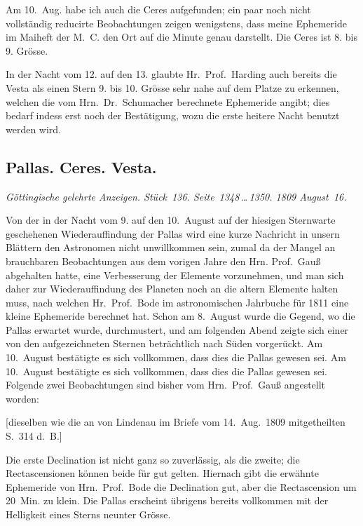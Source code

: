\documentclass[12pt,a4paper]{book}
\begin{document}
Am 10.~Aug. habe ich auch die Ceres aufgefunden; ein paar noch nicht vollst\"andig reducirte Beobachtungen zeigen wenigstens, dass meine Ephemeride im Maiheft der M.~C. den Ort auf die Minute genau darstellt. Die Ceres ist 8. bis 9. Gr\"osse.

In der Nacht vom 12. auf den 13. glaubte Hr.~Prof.~Harding auch bereits die Vesta als einen Stern 9. bis 10. Gr\"osse sehr nahe auf dem Platze zu erkennen, welchen die vom Hrn.~Dr.~Schumacher berechnete Ephemeride angibt; dies bedarf indess erst noch der Best\"atigung, wozu die erste heitere Nacht benutzt werden wird.


\newpage
\subsection*{Pallas. Ceres. Vesta.}

\textit{G\"ottingische gelehrte Anzeigen. St\"uck~136. Seite~1348\,\ldots\,1350. 1809 August~16.}

Von der in der Nacht vom 9. auf den 10.~August auf der hiesigen Sternwarte geschehenen Wiederauffindung der Pallas wird eine kurze Nachricht in unsern Bl\"attern den Astronomen nicht unwillkommen sein, zumal da der Mangel an brauchbaren Beobachtungen aus dem vorigen Jahre den Hrn. Prof.~Gau{\ss} abgehalten hatte, eine Verbesserung der Elemente vorzunehmen, und man sich daher zur Wiederauffindung des Planeten noch an die altern Elemente halten muss, nach welchen Hr.~Prof.~Bode im astronomischen Jahrbuche f\"ur 1811 eine kleine Ephemeride berechnet hat. Schon am 8.~August wurde die Gegend, wo die Pallas erwartet wurde, durchmustert, und am folgenden Abend zeigte sich einer von den aufgezeichneten Sternen betr\"achtlich nach S\"uden vorger\"uckt. Am 10.~August best\"atigte es sich vollkommen, dass dies die Pallas gewesen sei. Am 10.~August best\"atigte es sich vollkommen, dass dies die Pallas gewesen sei. Folgende zwei Beobachtungen sind bisher vom Hrn.~Prof.~Gau{\ss} angestellt worden:

[dieselben wie die an von Lindenau im Briefe vom 14.~Aug.~1809 mitgetheilten S.~314 d.~B.]

Die erste Declination ist nicht ganz so zuverl\"assig, als die zweite; die Rectascensionen k\"onnen beide f\"ur gut gelten. Hiernach gibt die erw\"ahnte Ephemeride von Hrn.~Prof.~Bode die Declination gut, aber die Rectascension um 20~Min. zu klein. Die Pallas erscheint \"ubrigens bereits vollkommen mit der Helligkeit eines Sterns neunter Gr\"osse.
\end{document}
